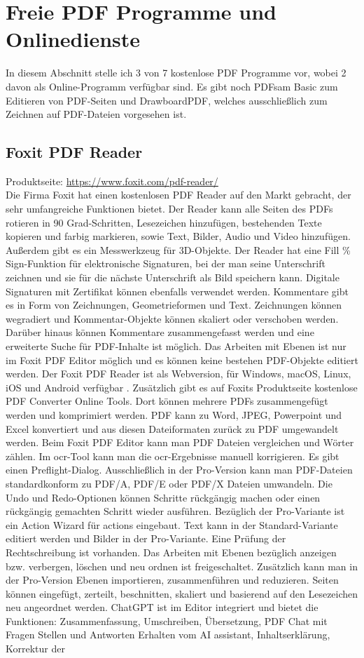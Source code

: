 \section{Freie PDF Programme und Onlinedienste}
In diesem Abschnitt stelle ich 3 von 7 kostenlose PDF Programme vor, wobei 2 davon als Online-Programm verfügbar sind. Es gibt noch PDFsam Basic zum Editieren von PDF-Seiten und DrawboardPDF, welches ausschließlich zum Zeichnen auf PDF-Dateien vorgesehen ist.

\subsection{Foxit PDF Reader}
Produktseite: \url{https://www.foxit.com/pdf-reader/} \\
Die Firma Foxit hat einen kostenlosen PDF Reader auf den Markt gebracht, der sehr umfangreiche Funktionen bietet. Der Reader kann alle Seiten des PDFs rotieren in 90 Grad-Schritten, Lesezeichen hinzufügen, bestehenden Texte kopieren und farbig markieren, sowie Text, Bilder, Audio und Video hinzufügen. Außerdem gibt es ein Messwerkzeug für 3D-Objekte. Der Reader hat eine Fill \% Sign-Funktion für elektronische Signaturen, bei der man seine Unterschrift zeichnen und sie für die nächste Unterschrift als Bild speichern kann. Digitale Signaturen mit Zertifikat können ebenfalls verwendet werden. Kommentare gibt es in Form von Zeichnungen, Geometrieformen und Text. Zeichnungen können wegradiert und Kommentar-Objekte können skaliert oder verschoben werden. Darüber hinaus können Kommentare zusammengefasst werden und eine erweiterte Suche für PDF-Inhalte ist möglich. Das Arbeiten mit Ebenen ist nur im Foxit PDF Editor möglich und es können keine bestehen PDF-Objekte editiert werden. Der Foxit PDF Reader ist als Webversion, für Windows, macOS, Linux, iOS und Android verfügbar \cite{foxit-reader}. Zusätzlich gibt es auf Foxits Produktseite kostenlose PDF Converter Online Tools. Dort können mehrere PDFs zusammengefügt werden und komprimiert werden. PDF kann zu Word, JPEG, Powerpoint und Excel konvertiert und aus diesen Dateiformaten zurück zu PDF umgewandelt werden. Beim Foxit PDF Editor kann man PDF Dateien vergleichen und Wörter zählen. Im \gls{ocr}-Tool kann man die \gls{ocr}-Ergebnisse manuell korrigieren. Es gibt einen Preflight-Dialog. Ausschließlich in der Pro-Version kann man PDF-Dateien standardkonform zu PDF/A, PDF/E oder PDF/X Dateien umwandeln. Die Undo und Redo-Optionen können Schritte rückgängig machen oder einen rückgängig gemachten Schritt wieder ausführen. Bezüglich der Pro-Variante ist ein Action Wizard für actions eingebaut. Text kann in der Standard-Variante editiert werden und Bilder in der Pro-Variante. Eine Prüfung der Rechtschreibung ist vorhanden. Das Arbeiten mit Ebenen bezüglich anzeigen bzw. verbergen, löschen und neu ordnen ist freigeschaltet. Zusätzlich kann man in der Pro-Version Ebenen importieren, zusammenführen und reduzieren. Seiten können eingefügt, zerteilt, beschnitten, skaliert und basierend auf den Lesezeichen neu angeordnet werden. ChatGPT ist im Editor integriert und bietet die Funktionen: Zusammenfassung, Umschreiben, Übersetzung, PDF Chat mit Fragen Stellen und Antworten Erhalten vom AI assistant, Inhaltserklärung, Korrektur der 